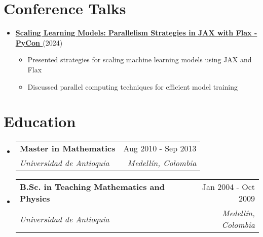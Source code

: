 \documentclass[letterpaper,11pt]{article}
\makeatletter
\newcommand{\resumeSubheading}[4]{
  \vspace{-2pt}
  \item[]
  \begin{tabular*}{\textwidth}{@{\extracolsep{\fill}}l r}
    \textbf{#1} & #2 \\
    \textit{#3} & \textit{#4} \\
  \end{tabular*}
  \vspace{-5pt}
}
\makeatother
\begin{document}
\section{Conference Talks}
\begin{itemize}[leftmargin=*]
    \item \textbf{\href{https://www.youtube.com/watch?v=m4hP1soE414}{Scaling Learning Models: Parallelism Strategies in JAX with Flax - PyCon \faYoutube}} (2024)
    \begin{itemize}
        \item Presented strategies for scaling machine learning models using JAX and Flax
        \item Discussed parallel computing techniques for efficient model training
    \end{itemize}
\end{itemize}

\section{Education}
\begin{itemize}[leftmargin=0pt, itemindent=0pt, label={}]
\resumeSubheading
{Master in Mathematics}{Aug 2010 - Sep 2013}
{Universidad de Antioquia}{Medellín, Colombia}

\resumeSubheading
{B.Sc. in Teaching Mathematics and Physics}{Jan 2004 - Oct 2009}
{Universidad de Antioquia}{Medellín, Colombia}
\end{itemize}
\end{document}
